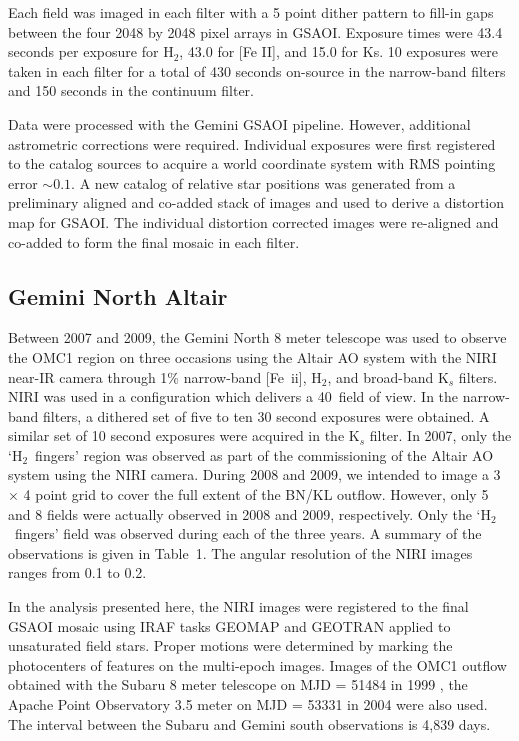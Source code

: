 \documentclass{aa}
\newcommand{\Feii}{[Fe~{\sc ii}]}
\newcommand{\hh}{\ensuremath{\textrm{H}_{2}}}			%
\begin{document}
Each field was imaged in each filter with a 5 point dither pattern to fill-in gaps between the 
four 2048 by 2048 pixel arrays in GSAOI.    Exposure times were 43.4 seconds per exposure 
for \hh, 43.0 for [Fe II], and 15.0 for Ks.  10 exposures were taken in each filter for a total of 
430 seconds on-source in the narrow-band filters and 150 seconds in the continuum filter.

Data were processed with the Gemini GSAOI pipeline.  However, additional astrometric
corrections were required.   Individual exposures were first registered to the
\citet{Muench2002a} catalog sources to acquire a world coordinate system with
RMS pointing error $\sim0.1$\arcsec .     A new catalog of relative star positions
was generated from a preliminary aligned and co-added stack of images and used
to derive a distortion map for GSAOI.    The individual distortion corrected images were 
re-aligned and co-added to form the final mosaic in each filter.  

\subsection{Gemini North Altair}

Between 2007 and 2009, the Gemini North 8 meter telescope was used to observe 
the OMC1 region on three occasions using the Altair AO system with the NIRI near-IR 
camera through  1\% narrow-band \Feii , \hh , and broad-band K$_s$ filters.    
NIRI was used in a configuration which
delivers a  40\arcsec\ field of view.  In the narrow-band filters, a dithered set of five to ten 
30 second  exposures were obtained.    A similar set of 10 second exposures were
acquired in the K$_s$ filter.     In 2007, only the `\hh\  fingers' region was observed as part
of the commissioning of the Altair AO system using the NIRI camera.   During 2008 and 2009,
we intended to image a 3 $\times$ 4 point grid to cover the full extent of the BN/KL outflow.
However, only 5 and 8 fields were actually observed in 2008 and 2009, respectively.    Only
the  `\hh\  fingers'  field was observed during each of the three years.   A summary of the 
observations is given in Table~1.   The angular resolution of the NIRI images ranges from 0.1 
to 0.2\arcsec . 

In the analysis presented here, the NIRI images were registered to the final GSAOI mosaic
using IRAF tasks GEOMAP and GEOTRAN applied to unsaturated field stars.    
Proper motions were determined by marking  the photocenters of features on the multi-epoch
images.     Images of the OMC1 outflow obtained with the 
Subaru 8 meter telescope on MJD = 51484 in 1999 \citep{Kaifu2000},
the Apache Point Observatory 3.5 meter on MJD = 53331 in 2004  \citep{Bally2011}
were also used.    The interval between the Subaru and Gemini south observations 
is 4,839 days.   
\end{document}
